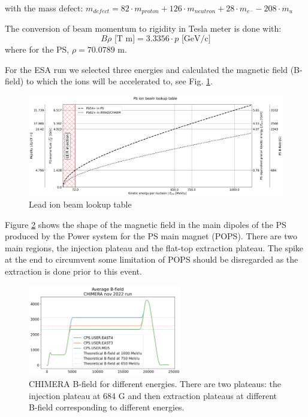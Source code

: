 with the mass defect: $m_{defect}=82\cdot m_{proton} + 126\cdot m_{neutron} + 28\cdot m_{e^{-}} - 208\cdot m_{u}$ 



The conversion of beam momentum to rigidity in Tesla meter is done with: 
$$B\rho \text{ [T m]} = 3.3356\cdot p \text{ [GeV/c]}$$
where for the PS, $\rho = 70.0789$ m.

For the ESA run we selected three energies and calculated the magnetic field (B-field) to which the ions will be accelerated to, see Fig. \ref{fig:lookup table}.

\begin{figure}[!htb]
\centering
\includegraphics[width=1.0\textwidth]{images/kinetic_energy_lookup_table_zoom_B_field.png}
\caption{Lead ion beam lookup table}
\label{fig:lookup table}
\end{figure}

Figure \ref{fig:bfield} shows the shape of the magnetic field in the main dipoles of the PS produced by the Power system for the PS main magnet (POPS). There are two main regions, the injection plateau and the flat-top extraction plateau. The spike at the end to circumvent some limitation of POPS should be disregarded as the extraction is done prior to this event.

\begin{figure}[!htb]
\centering
\includegraphics[width=0.6\textwidth]{images/average_b_field_chimera.png}
\caption{CHIMERA B-field for different energies. There are two plateaus: the injection plateau at 684 G and then extraction plateaus at different B-field corresponding to different energies.}
\label{fig:bfield}
\end{figure}

